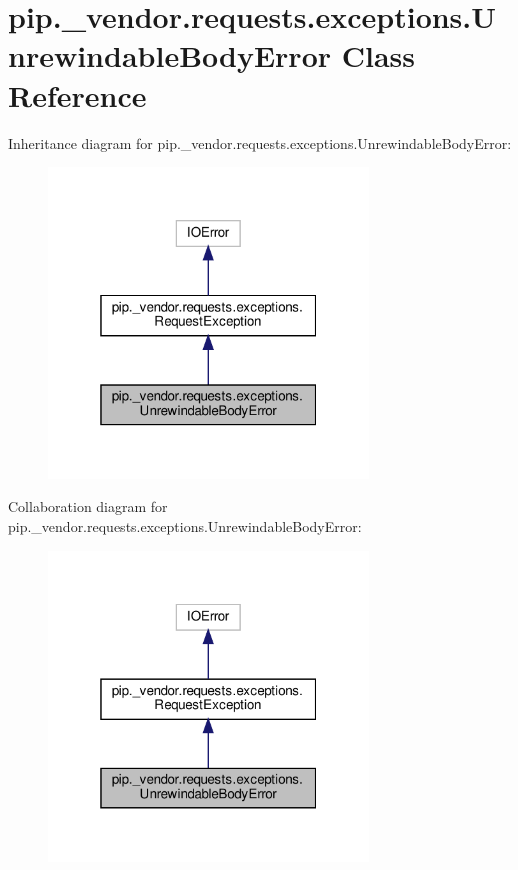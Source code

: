 \hypertarget{classpip_1_1__vendor_1_1requests_1_1exceptions_1_1UnrewindableBodyError}{}\section{pip.\+\_\+vendor.\+requests.\+exceptions.\+Unrewindable\+Body\+Error Class Reference}
\label{classpip_1_1__vendor_1_1requests_1_1exceptions_1_1UnrewindableBodyError}


Inheritance diagram for pip.\+\_\+vendor.\+requests.\+exceptions.\+Unrewindable\+Body\+Error\+:
\nopagebreak
\begin{figure}[H]
\begin{center}
\leavevmode
\includegraphics[width=241pt]{classpip_1_1__vendor_1_1requests_1_1exceptions_1_1UnrewindableBodyError__inherit__graph}
\end{center}
\end{figure}


Collaboration diagram for pip.\+\_\+vendor.\+requests.\+exceptions.\+Unrewindable\+Body\+Error\+:
\nopagebreak
\begin{figure}[H]
\begin{center}
\leavevmode
\includegraphics[width=241pt]{classpip_1_1__vendor_1_1requests_1_1exceptions_1_1UnrewindableBodyError__coll__graph}
\end{center}
\end{figure}
